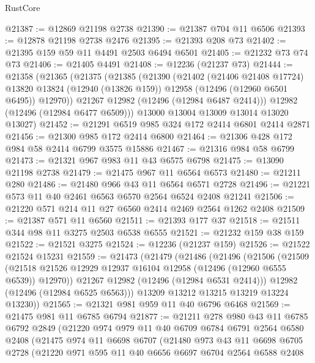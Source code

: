 \begin{lexlean}{RustCore}
\begin{coremodule}
@21387 := @12869 @21198 @2738
@21390 := @21387 @704 @11 @6506
@21393 := @12878 @21198 @2738 @2476
@21395 := @21393 @208 @73
@21402 := @21395 @159 @59 @11 @4491 @2503 @6494 @6501
@21405 := @21232 @73 @74 @73
@21406 := @21405 @4491
@21408 := @12236 (@21237 @73)
@21444 := @21358
    (@21365
      (@21375
        (@21385
          (@21390
            (@21402
              (@21406 @21408 @17724)
              @13820
              @13824
              (@12940 (@13826 @159))
              @12958
              (@12496 (@12960 @6501 @6495))
              @12970))
          @21267
          @12982
          (@12496 (@12984 @6487 @2414)))
        @12982
        (@12496 (@12984 @6477 @6509)))
      @13000
      @13004
      @13009
      @13014
      @13020
      @13027)
@21452 := @21291 @6519 @985 @324 @172 @2414 @6801 @2414 @2871
@21456 := @21300 @985 @172 @2414 @6800
@21464 := @21306 @428 @172 @984 @58 @2414 @6799 @3575 @15886
@21467 := @21316 @984 @58 @6799
@21473 := @21321 @967 @983 @11 @43 @6575 @6798
@21475 := @13090 @21198 @2738
@21479 := @21475 @967 @11 @6564 @6573
@21480 := @21211 @280
@21486 := @21480 @966 @43 @11 @6564 @6571 @2728
@21496 := @21221 @573 @11 @40 @2461 @6563 @6570 @2564 @6524 @2408 @21241
@21506 := @21220 @571 @214 @11 @27 @6560 @2414 @2469 @2564 @1262 @2408
@21509 := @21387 @571 @11 @6560
@21511 := @21393 @177 @37
@21518 := @21511 @344 @98 @11 @3275 @2503 @6538 @6555
@21521 := @21232 @159 @38 @159
@21522 := @21521 @3275
@21524 := @12236 (@21237 @159)
@21526 := @21522 @21524 @15231
@21559 := @21473
    (@21479
      (@21486
        (@21496
          (@21506
            (@21509
              (@21518 @21526 @12929 @12937 @16104 @12958 (@12496 (@12960 @6555 @6539)) @12970))
            @21267
            @12982
            (@12496 (@12984 @6531 @2414)))
          @12982
          (@12496 (@12984 @6525 @6563)))
        @13209
        @13212
        @13215
        @13219
        @13224
        @13230))
@21565 := @21321 @981 @959 @11 @40 @6796 @6468
@21569 := @21475 @981 @11 @6785 @6794
@21877 := @21211
    @278
    @980
    @43
    @11
    @6785
    @6792
    @2849
    (@21220
      @974
      @979
      @11
      @40
      @6709
      @6784
      @6791
      @2564
      @6580
      @2408
      (@21475
        @974
        @11
        @6698
        @6707
        (@21480
          @973
          @43
          @11
          @6698
          @6705
          @2728
          (@21220
            @971
            @595
            @11
            @40
            @6656
            @6697
            @6704
            @2564
            @6588
            @2408

\end{coremodule}
\end{lexlean}
